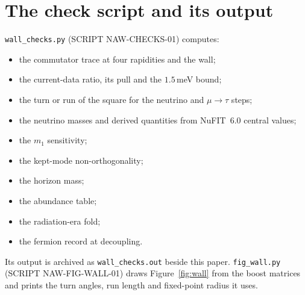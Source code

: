 \documentclass[11pt]{article}
\theoremstyle{definition}\newtheorem{hypothesis}{Hypothesis}\newtheorem{prediction}{Prediction}
\theoremstyle{remark}\newtheorem{remark}[theorem]{Remark}
\begin{document}
\section{The check script and its output}
\noindent\texttt{wall\_checks.py} (SCRIPT NAW-CHECKS-01) computes:
\begin{itemize}[nosep]
\item the commutator trace at four rapidities and the wall;
\item the current-data ratio, its pull and the $1.5$\,meV bound;
\item the turn or run of the square for the neutrino and $\mu\to\tau$ steps;
\item the neutrino masses and derived quantities from NuFIT~6.0 central values;
\item the $m_1$ sensitivity;
\item the kept-mode non-orthogonality;
\item the horizon mass;
\item the abundance table;
\item the radiation-era fold;
\item the fermion record at decoupling.
\end{itemize}
Its output is archived as \texttt{wall\_checks.out} beside this paper. \texttt{fig\_wall.py} (SCRIPT NAW-FIG-WALL-01) draws Figure~\ref{fig:wall} from the boost matrices and prints the turn angles, run length and fixed-point radius it uses.
\end{document}
